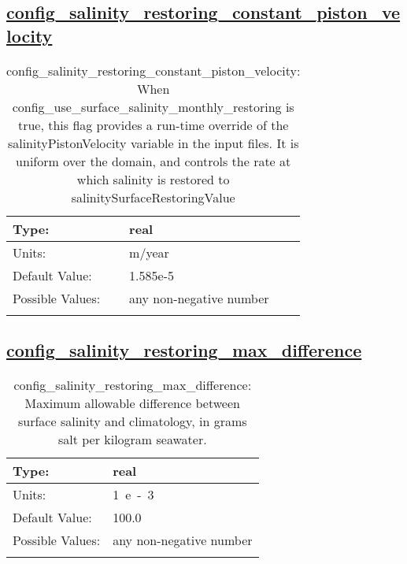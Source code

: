 \subsection[config\_salinity\_restoring\_constant\_piston\_velocity]{\hyperref[sec:nm_tab_tracer_forcing_activeTracers]{config\_salinity\_restoring\_constant\_piston\_velocity}}
\label{subsec:nm_sec_config_salinity_restoring_constant_piston_velocity}
\begin{center}
\begin{longtable}{| p{2.0in} || p{4.0in} |}
    \hline
    Type: & real \\
    \hline
    Units: & \si{m/year} \\
    \hline
    Default Value: & 1.585e-5 \\
    \hline
    Possible Values: & any non-negative number \\
    \hline
    \caption{config\_salinity\_restoring\_constant\_piston\_velocity: When config\_use\_surface\_salinity\_monthly\_restoring is true, this flag provides a run-time override of the salinityPistonVelocity variable in the input files.  It is uniform over the domain, and controls the rate at which salinity is restored to salinitySurfaceRestoringValue}
\end{longtable}
\end{center}
\subsection[config\_salinity\_restoring\_max\_difference]{\hyperref[sec:nm_tab_tracer_forcing_activeTracers]{config\_salinity\_restoring\_max\_difference}}
\label{subsec:nm_sec_config_salinity_restoring_max_difference}
\begin{center}
\begin{longtable}{| p{2.0in} || p{4.0in} |}
    \hline
    Type: & real \\
    \hline
    Units: & \si{1.e-3} \\
    \hline
    Default Value: & 100.0 \\
    \hline
    Possible Values: & any non-negative number \\
    \hline
    \caption{config\_salinity\_restoring\_max\_difference: Maximum allowable difference between surface salinity and climatology, in grams salt per kilogram seawater.}
\end{longtable}
\end{center}
